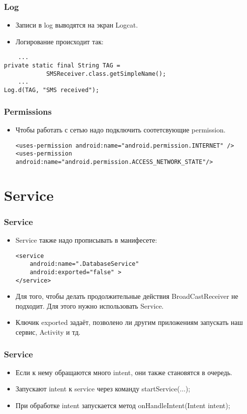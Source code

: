 \documentclass[utf8]{beamer}
\begin{document}
\begin{frame}[fragile]
    \frametitle{Log}
    \begin{itemize}
        \item Записи в log выводятся на экран Logcat.
        \item Логирование происходит так:
    \end{itemize}
    \begin{lstlisting}
    ...
private static final String TAG = 
            SMSReceiver.class.getSimpleName();
    ...
Log.d(TAG, "SMS received");    
    \end{lstlisting}
\end{frame}
\begin{frame}[fragile]
    \frametitle{Permissions}
    \begin{itemize}
        \item Чтобы работать с сетью надо подключить соотетсвующие permission.
        \begin{lstlisting}
<uses-permission android:name="android.permission.INTERNET" /> 
<uses-permission  android:name="android.permission.ACCESS_NETWORK_STATE"/>        
        \end{lstlisting}
    \end{itemize}
\end{frame}
\section{Service}    
\begin{frame}[fragile]
    \frametitle{Service}
    \begin{itemize}
        \item Service также надо прописывать в манифесете:
        \begin{lstlisting}
<service
    android:name=".DatabaseService"
    android:exported="false" >
</service>        
        \end{lstlisting}
        \item Для того, чтобы делать продолжительные действия BroadCastReceiver не подходит. Для этого нужно использовать Service.
        \item Ключик exported задаёт, позволено ли другим приложениям запускать наш сервис, Activity и тд.
    \end{itemize}
\end{frame}
\begin{frame}[fragile]
    \frametitle{Service}
    \begin{itemize}
        \item Если к нему обращаются много intent, они также становятся в очередь.
        \item Запускают intent к service через команду startService(...);
        \item При обработке intent запускается метод onHandleIntent(Intent intent);
    \end{itemize}
\end{frame}
\end{document}
